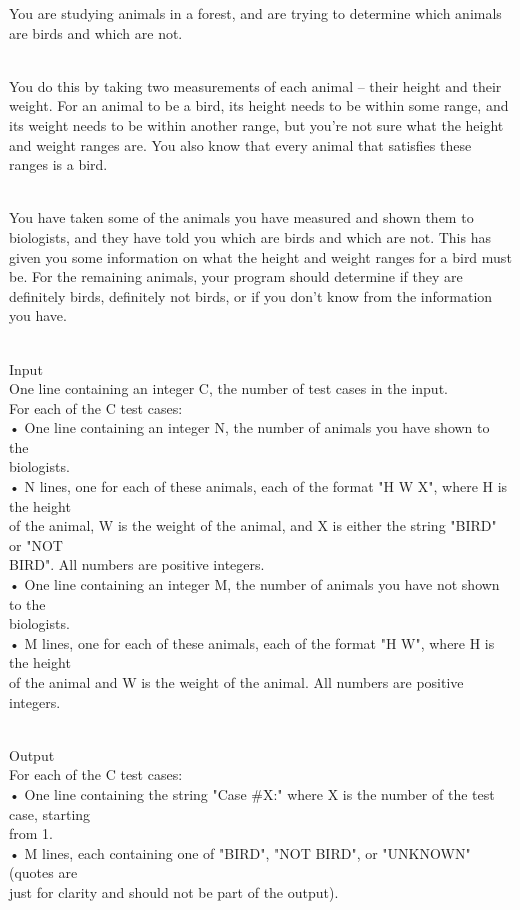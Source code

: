 



   You are studying animals in a forest, and are trying to determine which animals are birds and which are not.  


\\   You do this by taking two measurements of each animal – their height and their weight. For an animal to be a bird, its height needs to be within some range, and its weight needs to be within another range, but you're not sure what the height and weight ranges are. You also know that every animal that satisfies these ranges is a bird.  


\\   You have taken some of the animals you have measured and shown them to biologists, and they have told you which are birds and which are not. This has given you some information on what the height and weight ranges for a bird must be. For the remaining animals, your program should determine if they are definitely birds, definitely not birds, or if you don't know from the information you have.  


\\   Input   
\\   One line containing an integer C, the number of test cases in the input.   
\\   For each of the C test cases:   
\\   • One line containing an integer N, the number of animals you have shown to the   
\\   biologists.   
\\   • N lines, one for each of these animals, each of the format "H W X", where H is the height   
\\   of the animal, W is the weight of the animal, and X is either the string "BIRD" or "NOT   
\\   BIRD". All numbers are positive integers.   
\\   • One line containing an integer M, the number of animals you have not shown to the   
\\   biologists.   
\\   • M lines, one for each of these animals, each of the format "H W", where H is the height   
\\   of the animal and W is the weight of the animal. All numbers are positive integers.  


\\   Output   
\\   For each of the C test cases:   
\\   • One line containing the string "Case \#X:" where X is the number of the test case, starting   
\\   from 1.   
\\   • M lines, each containing one of "BIRD", "NOT BIRD", or "UNKNOWN" (quotes are   
\\   just for clarity and should not be part of the output).  


